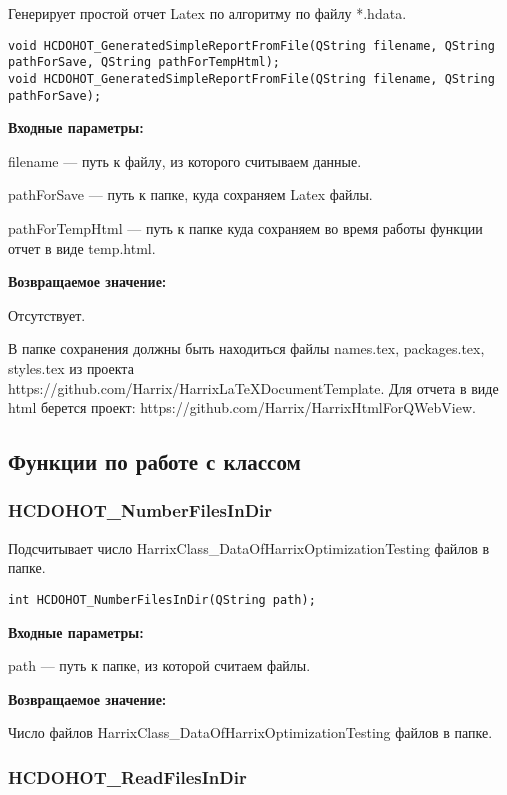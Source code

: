 \documentclass[a4paper,12pt]{article}
\begin{document}
Генерирует простой отчет Latex по алгоритму по файлу *.hdata.


\begin{lstlisting}[label=code_syntax_HCDOHOT_GeneratedSimpleReportFromFile,caption=Синтаксис]
void HCDOHOT_GeneratedSimpleReportFromFile(QString filename, QString pathForSave, QString pathForTempHtml);
void HCDOHOT_GeneratedSimpleReportFromFile(QString filename, QString pathForSave);
\end{lstlisting}

\textbf{Входные параметры:}

filename --- путь к файлу, из которого считываем данные.
 
    pathForSave --- путь к папке, куда сохраняем Latex файлы.
 
    pathForTempHtml --- путь к папке куда сохраняем во время работы функции отчет в виде temp.html.

\textbf{Возвращаемое значение:}

Отсутствует.

В папке сохранения должны быть находиться файлы names.tex, packages.tex, styles.tex из проекта https://github.com/Harrix/HarrixLaTeXDocumentTemplate. Для отчета в виде html берется проект: https://github.com/Harrix/HarrixHtmlForQWebView.


\subsection{Функции по работе с классом}

\subsubsection{HCDOHOT\_NumberFilesInDir}\label{HCDOHOT_NumberFilesInDir}

Подсчитывает число HarrixClass\_DataOfHarrixOptimizationTesting файлов в папке.


\begin{lstlisting}[label=code_syntax_HCDOHOT_NumberFilesInDir,caption=Синтаксис]
int HCDOHOT_NumberFilesInDir(QString path);
\end{lstlisting}

\textbf{Входные параметры:}

path --- путь к папке, из которой считаем файлы.

\textbf{Возвращаемое значение:}

Число файлов HarrixClass\_DataOfHarrixOptimizationTesting файлов в папке.


\subsubsection{HCDOHOT\_ReadFilesInDir}\label{HCDOHOT_ReadFilesInDir}
\end{document}
